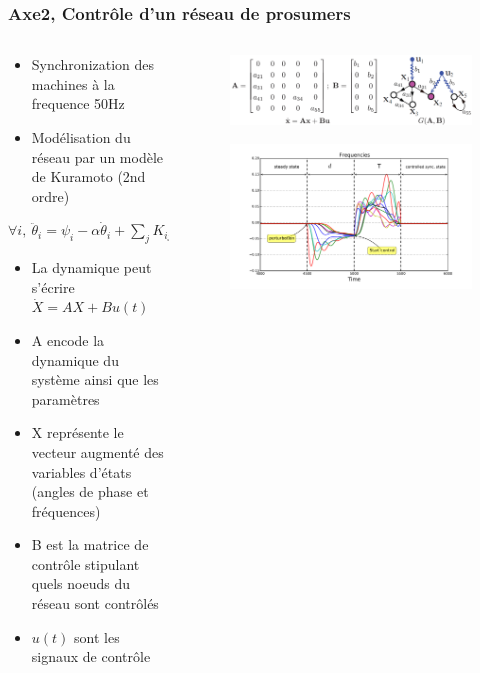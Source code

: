 \documentclass[xcolor=dvipsnames]{beamer}
\begin{document}
\begin{frame}
	\frametitle{Axe2, Contrôle d'un réseau de prosumers}
	
	\begin{columns}
		\begin{column}{.5\textwidth}
			\begin{footnotesize}
				\begin{itemize}
					\item Synchronization des machines à la frequence 50Hz
					\item Modélisation du réseau par un modèle de Kuramoto (2nd ordre)
				\end{itemize}
				\begin{center}
					$ \forall i,\ \ddot{\theta}_i = \psi_i - \alpha \dot{\theta}_i + \sum_j K_{ij}g_{ij}sin[ \theta_j - \theta_i ] $
				\end{center}
 				\begin{itemize}
 					\item La dynamique peut s'écrire $ \dot{X} = A X + B u(t) $
 					\item A encode la dynamique du système ainsi que les paramètres
 					\item X représente le vecteur augmenté des variables d'états (angles de phase et fréquences)
 					\item B est la matrice de contrôle stipulant quels noeuds du réseau sont contrôlés
 					\item $u(t)$ sont les signaux de contrôle
 				\end{itemize}
			\end{footnotesize}
		\end{column}
		\begin{column}{.5\textwidth}	
		 	\begin{figure}
 				\includegraphics[scale=.25]{control_matrices}
 			\end{figure}
 			\begin{figure}
 				\includegraphics[scale=.25]{frequencies}

\end{figure}
\end{column}
\end{columns}
\end{frame}
\end{document}
